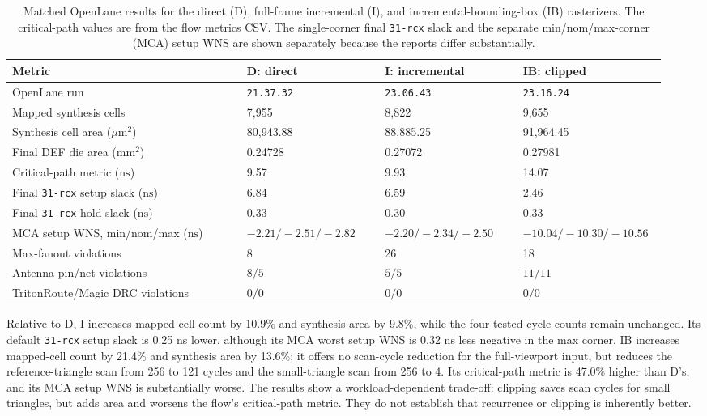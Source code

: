 \documentclass[10pt,a4paper]{article}
\begin{document}
\begin{table}[!htbp]
\centering
\scriptsize
\setlength{\tabcolsep}{3pt}
\begin{tabular}{p{0.34\linewidth}p{0.20\linewidth}p{0.20\linewidth}p{0.20\linewidth}}
\toprule
Metric & D: direct & I: incremental & IB: clipped\\
\midrule
OpenLane run & \texttt{21.37.32} & \texttt{23.06.43} & \texttt{23.16.24}\\
Mapped synthesis cells & 7,955 & 8,822 & 9,655\\
Synthesis cell area (\(\mu\mathrm{m}^2\)) & 80,943.88 & 88,885.25 & 91,964.45\\
Final DEF die area (\(\mathrm{mm}^2\)) & 0.24728 & 0.27072 & 0.27981\\
Critical-path metric (\(\mathrm{ns}\)) & 9.57 & 9.93 & 14.07\\
Final \texttt{31-rcx} setup slack (\(\mathrm{ns}\)) & 6.84 & 6.59 & 2.46\\
Final \texttt{31-rcx} hold slack (\(\mathrm{ns}\)) & 0.33 & 0.30 & 0.33\\
MCA setup WNS, min/nom/max (\(\mathrm{ns}\)) & \(-2.21/-2.51/-2.82\) & \(-2.20/-2.34/-2.50\) & \(-10.04/-10.30/-10.56\)\\
Max-fanout violations & 8 & 26 & 18\\
Antenna pin/net violations & \(8/5\) & \(5/5\) & \(11/11\)\\
TritonRoute/Magic DRC violations & \(0/0\) & \(0/0\) & \(0/0\)\\
\bottomrule
\end{tabular}
\caption{Matched OpenLane results for the direct (D), full-frame
incremental (I), and incremental-bounding-box (IB) rasterizers. The
critical-path values are from the flow metrics CSV. The single-corner final
\texttt{31-rcx} slack and the separate min/nom/max-corner (MCA) setup WNS
are shown separately because the reports differ substantially.}
\label{tab:matched-physical}
\end{table}

Relative to D, I increases mapped-cell count by 10.9\% and synthesis area by
9.8\%, while the four tested cycle counts remain unchanged. Its default
\texttt{31-rcx} setup slack is 0.25 ns lower, although its MCA worst setup
WNS is 0.32 ns less negative in the max corner. IB increases mapped-cell
count by 21.4\% and synthesis area by 13.6\%; it offers no scan-cycle
reduction for the full-viewport input, but reduces the reference-triangle
scan from 256 to 121 cycles and the small-triangle scan from 256 to 4.
Its critical-path metric is 47.0\% higher than D's, and its MCA setup WNS
is substantially worse. The results show a workload-dependent trade-off: clipping saves scan cycles
for small triangles, but adds area and worsens the flow's critical-path
metric. They do not establish that recurrence or clipping is inherently
better.
\end{document}
